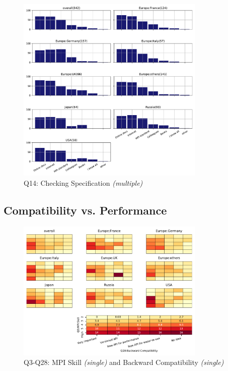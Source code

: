 \documentclass[conference,10pt,letterpaper]{IEEEtran}
\begin{document}
\begin{figure}[htb]
\begin{center}
\includegraphics[width=9cm]{Figs/Q14.pdf}
\caption{Q14: Checking Specification {\it(multiple)}}
\label{fig:schecking-spec}
\end{center}
\end{figure}


\subsection{Compatibility vs. Performance}

\begin{figure}[htb]
\begin{center}
\includegraphics[width=9cm]{Figs/Q3-Q28.pdf}
\caption{Q3-Q28: MPI Skill {\it(single)} and Backward Compatibility {\it(single)}}
\label{fig:skill-and-compatibility}
\end{center}
\end{figure}
\end{document}
